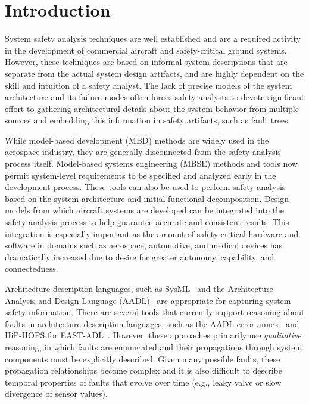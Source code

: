 \section{Introduction}

System safety analysis techniques are well established and are a required activity in the development of commercial aircraft and safety-critical ground systems. However, these techniques are based on informal system descriptions that are separate from the actual system design artifacts, and are highly dependent on the skill and intuition of a safety analyst. The lack of precise models of the system architecture and its failure modes often forces safety analysts to devote significant effort to gathering architectural details about the system behavior from multiple sources and embedding this information in safety artifacts, such as fault trees.

While model-based development (MBD) methods are widely used in the aerospace industry, they are generally disconnected from the safety analysis process itself. Model-based systems engineering (MBSE) methods and tools  now permit system-level requirements to be specified and analyzed early in the development process. These tools can also be used to perform safety analysis based on the system architecture and initial functional decomposition. Design models from which aircraft systems are developed can be integrated into the safety analysis process to help guarantee accurate and consistent results. This integration is especially important as the amount of safety-critical hardware and software in domains such as aerospace, automotive, and medical devices has dramatically increased due to desire for greater autonomy, capability, and connectedness.

Architecture description languages, such as SysML~\cite{SysML} and the Architecture Analysis and Design Language (AADL)~\cite{AADL} are appropriate for capturing system safety information.  There are several tools that currently support reasoning about faults in architecture description languages, such as the AADL error annex~\cite{Larson:2013:IAE:2527269.2527271} and HiP-HOPS for EAST-ADL~\cite{CHEN201391}.  However, these approaches primarily use {\em qualitative} reasoning, in which faults are enumerated and their propagations through system components must be explicitly described.  Given many possible faults, these propagation relationships become complex and it is also difficult to describe temporal properties of faults that evolve over time (e.g., leaky valve or slow divergence of sensor values).

